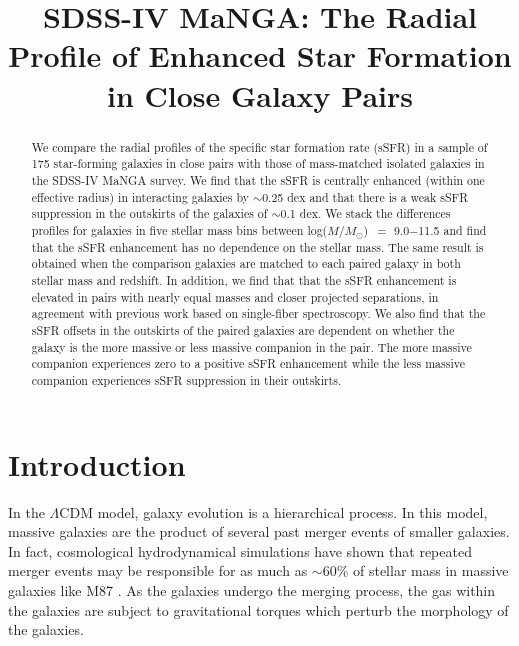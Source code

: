 \documentclass[iop,revtex4,twocolumn,apj,numberedappendix,appendixfloats]{emulateapj}
\newcommand{\logm}{log($M/M_{\odot}$)}
\begin{document}
\title{
SDSS-IV MaNGA: The Radial Profile of Enhanced Star Formation in Close Galaxy Pairs
}



\begin{abstract}
We compare the radial profiles of the specific star formation rate (sSFR) in a sample of 175 star-forming galaxies in close pairs with those of mass-matched isolated galaxies in the SDSS-IV MaNGA survey. We find that the sSFR is centrally enhanced (within one effective radius) in interacting galaxies by $\sim$0.25 dex and that there is a weak sSFR suppression in the outskirts of the galaxies of $\sim$0.1 dex. We stack the differences profiles for galaxies in five stellar mass bins between \logm\ $=$ 9.0$-$11.5 and find that the sSFR enhancement has no dependence on the stellar mass. The same result is obtained when the comparison galaxies are matched to each paired galaxy in both stellar mass and redshift. In addition, we find that that the sSFR enhancement is elevated in pairs with nearly equal masses and closer projected separations, in agreement with previous work based on single-fiber spectroscopy. We also find that the sSFR offsets in the outskirts of the paired galaxies are dependent on whether the galaxy is the more massive or less massive companion in the pair. The more massive companion experiences zero to a positive sSFR enhancement while the less massive companion experiences sSFR suppression in their outskirts.
\end{abstract}


\section{Introduction}\label{sec:intro}

In the $\Lambda$CDM model, galaxy evolution is a hierarchical process. In this model, massive galaxies are the product of several past merger events of smaller galaxies. In fact, cosmological hydrodynamical simulations have shown that repeated merger events may be responsible for as much as $\sim$60\% of stellar mass in massive galaxies like M87 \citep[e.g.,][]{Rodriguez-Gomez:2016,Pillepich:2018}. As the galaxies undergo the merging process, the gas within the galaxies are subject to gravitational torques which perturb the morphology of the galaxies.
\end{document}
